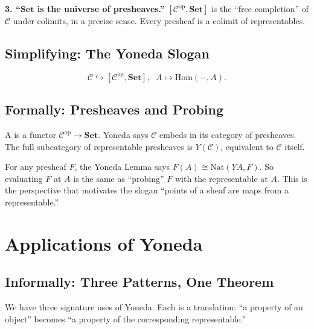 \textbf{3. ``$\mathbf{Set}$ is the universe of presheaves.''}\quad
$[\mathcal{C}^{\mathrm{op}}, \mathbf{Set}]$ is the ``free completion'' of
$\mathcal{C}$ under colimits, in a precise sense. Every presheaf is a
colimit of representables.

\subsection{Simplifying: The Yoneda Slogan}

\begin{equation*}
  \boxed{\;\;
    \mathcal{C} \hookrightarrow [\mathcal{C}^{\mathrm{op}}, \mathbf{Set}],
    \;\;
    A \mapsto \mathrm{Hom}(-, A).
  \;\;}
\end{equation*}

\subsection{Formally: Presheaves and Probing}

A  is a functor $\mathcal{C}^{\mathrm{op}}
\to \mathbf{Set}$. Yoneda says $\mathcal{C}$ embeds in its category of
presheaves. The full subcategory of representable presheaves is
$\mathit{Y}(\mathcal{C})$, equivalent to $\mathcal{C}$ itself.

For any presheaf $F$, the Yoneda Lemma says $F(A) \cong
\mathrm{Nat}(\mathit{Y} A, F)$. So evaluating $F$ at $A$ is the same as
``probing'' $F$ with the representable at $A$. This is the perspective
that motivates the slogan ``points of a sheaf are maps from a
representable.''


\section{Applications of Yoneda}
\label{sec:yoneda-apps}

\subsection{Informally: Three Patterns, One Theorem}

We have three signature uses of Yoneda. Each is a translation: ``a
property of an object'' becomes ``a property of the corresponding
representable.''

